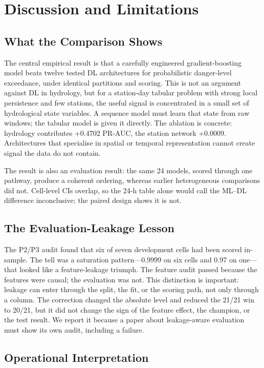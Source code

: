 \documentclass[conference]{IEEEtran}
\begin{document}
\section{Discussion and Limitations}

\subsection{What the Comparison Shows}

The central empirical result is that a carefully engineered gradient-boosting model beats twelve tested DL architectures for probabilistic danger-level exceedance, under identical partitions and scoring. This is not an argument against DL in hydrology, but for a station-day tabular problem with strong local persistence and few stations, the useful signal is concentrated in a small set of hydrological state variables. A sequence model must learn that state from raw windows; the tabular model is given it directly. The ablation is concrete: hydrology contributes +0.4702 PR-AUC, the station network +0.0009. Architectures that specialise in spatial or temporal representation cannot create signal the data do not contain.

The result is also an evaluation result: the same 24 models, scored through one pathway, produce a coherent ordering, whereas earlier heterogeneous comparisons did not. Cell-level CIs overlap, so the 24-h table alone would call the ML--DL difference inconclusive; the paired design shows it is not.

\subsection{The Evaluation-Leakage Lesson}

The P2/P3 audit found that six of seven development cells had been scored in-sample. The tell was a saturation pattern---0.9999 on six cells and 0.97 on one---that looked like a feature-leakage triumph. The feature audit passed because the features were causal; the evaluation was not. This distinction is important: leakage can enter through the split, the fit, or the scoring path, not only through a column. The correction changed the absolute level and reduced the 21/21 win to 20/21, but it did not change the sign of the feature effect, the champion, or the test result. We report it because a paper about leakage-aware evaluation must show its own audit, including a failure.

\subsection{Operational Interpretation}
\end{document}
